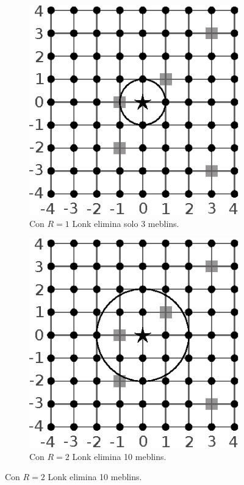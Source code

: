\documentclass{oci}
\begin{document}
\begin{problemDescription}
  \begin{figure}[h]
    \centering
    \begin{subfigure}{0.3\textwidth}
      \centering
      \includegraphics[scale=0.8]{zolda2}
      \caption*{Con $R=1$ Lonk elimina solo 3 meblins.}
    \end{subfigure}
    \hspace{3em}
    \begin{subfigure}{0.3\textwidth}
      \centering
      \includegraphics[scale=0.8]{zolda3}
      \caption*{Con $R=2$ Lonk elimina 10 meblins.}
    \end{subfigure}
  \end{figure}

\end{problemDescription}
\end{document}
